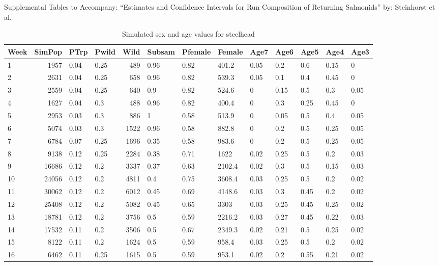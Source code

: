 \documentclass[12pt]{article}
\begin{document}
\begin{center}
\LARGE 
Supplemental Tables to Accompany:\linebreak
``Estimates and Confidence Intervals for Run Composition\linebreak
of Returning Salmonids''\linebreak
by: Steinhorst et al.
\end{center}


\begin{table}[H]
\caption{Simulated sex and age values for steelhead}
\label{table:SHsim}
\begin{tabular}{ | l | r | l | l | r | l | l | l | l |l | l | l | l | }
\hline
Week&SimPop&PTrp&Pwild&Wild&Subsam&Pfemale&Female&Age7&Age6&Age5&Age4&Age3 \\ \hline
1&1957&0.04&0.25&489&0.96&0.82&401.2&0.05&0.2&0.6&0.15&0 \\ \hline
2&2631&0.04&0.25&658&0.96&0.82&539.3&0.05&0.1&0.4&0.45&0 \\ \hline
3&2559&0.04&0.25&640&0.9&0.82&524.6&0&0.15&0.5&0.3&0.05 \\ \hline
4&1627&0.04&0.3&488&0.96&0.82&400.4&0&0.3&0.25&0.45&0 \\ \hline
5&2953&0.03&0.3&886&1&0.58&513.9&0&0.05&0.5&0.4&0.05 \\ \hline
6&5074&0.03&0.3&1522&0.96&0.58&882.8&0&0.2&0.5&0.25&0.05 \\ \hline
7&6784&0.07&0.25&1696&0.35&0.58&983.6&0&0.2&0.5&0.25&0.05 \\ \hline
8&9138&0.12&0.25&2284&0.38&0.71&1622&0.02&0.25&0.5&0.2&0.03 \\ \hline
9&16686&0.12&0.2&3337&0.37&0.63&2102.4&0.02&0.3&0.5&0.15&0.03 \\ \hline
10&24056&0.12&0.2&4811&0.4&0.75&3608.4&0.03&0.25&0.5&0.2&0.02 \\ \hline
11&30062&0.12&0.2&6012&0.45&0.69&4148.6&0.03&0.3&0.45&0.2&0.02 \\ \hline
12&25408&0.12&0.2&5082&0.45&0.65&3303&0.03&0.25&0.45&0.25&0.02 \\ \hline
13&18781&0.12&0.2&3756&0.5&0.59&2216.2&0.03&0.27&0.45&0.22&0.03 \\ \hline
14&17532&0.11&0.2&3506&0.5&0.67&2349.3&0.02&0.21&0.5&0.25&0.02 \\ \hline
15&8122&0.11&0.2&1624&0.5&0.59&958.4&0.03&0.25&0.5&0.2&0.02 \\ \hline
16&6462&0.11&0.25&1615&0.5&0.59&953.1&0.02&0.2&0.55&0.21&0.02 \\ \hline

\end{tabular}
\end{table}
\end{document}
